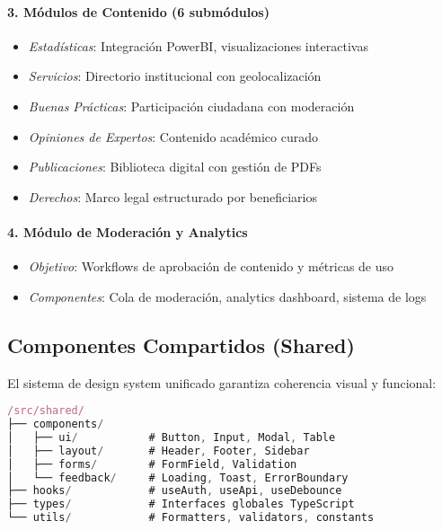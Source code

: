 \documentclass[12pt,a4paper]{article}
\begin{document}
\paragraph{3. Módulos de Contenido (6 submódulos)}
\begin{itemize}
    \item \textit{Estadísticas}: Integración PowerBI, visualizaciones interactivas
    \item \textit{Servicios}: Directorio institucional con geolocalización
    \item \textit{Buenas Prácticas}: Participación ciudadana con moderación
    \item \textit{Opiniones de Expertos}: Contenido académico curado
    \item \textit{Publicaciones}: Biblioteca digital con gestión de PDFs
    \item \textit{Derechos}: Marco legal estructurado por beneficiarios
\end{itemize}

\paragraph{4. Módulo de Moderación y Analytics}
\begin{itemize}
    \item \textit{Objetivo}: Workflows de aprobación de contenido y métricas de uso
    \item \textit{Componentes}: Cola de moderación, analytics dashboard, sistema de logs
\end{itemize}

\subsection{Componentes Compartidos (Shared)}

El sistema de design system unificado garantiza coherencia visual y funcional:

\begin{lstlisting}[language=javascript, caption=Arquitectura de Componentes Compartidos]
/src/shared/
├── components/
│   ├── ui/           # Button, Input, Modal, Table
│   ├── layout/       # Header, Footer, Sidebar
│   ├── forms/        # FormField, Validation
│   └── feedback/     # Loading, Toast, ErrorBoundary
├── hooks/            # useAuth, useApi, useDebounce
├── types/            # Interfaces globales TypeScript
└── utils/            # Formatters, validators, constants
\end{lstlisting}
\end{document}
